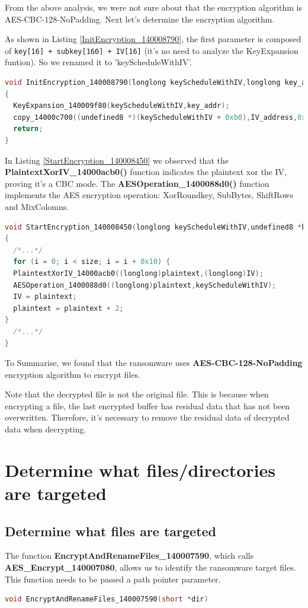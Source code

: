 \documentclass[11pt]{article}
\begin{document}
From the above analysis, we were not sure about that the encryption algorithm is AES-CBC-128-NoPadding. Next let's determine the encryption algorithm. 

As shown in Listing \ref{InitEncryption_140008790}, the first parameter is composed of \lstinline|key[16] + subkey[160] + IV[16]| (it's no need to analyze the KeyExpansion funtion). So we renamed it to 'keyScheduleWithIV'.
\begin{lstlisting}[language=c++, caption=InitEncryption\_140008790, label=InitEncryption_140008790]
void InitEncryption_140008790(longlong keyScheduleWithIV,longlong key_addr,undefined8 *IV_address)
{
  KeyExpansion_140009f80(keyScheduleWithIV,key_addr);
  copy_14000c700((undefined8 *)(keyScheduleWithIV + 0xb0),IV_address,0x10);
  return;
}
\end{lstlisting}

In Listing \ref{StartEncryption_140008450} we observed that the \textbf{PlaintextXorIV\_14000acb0()} function indicates the plaintext xor the IV, proving it's a CBC mode. The \textbf{AESOperation\_1400088d0()} function implements the AES encryption operation: XorRoundkey, SubBytes, ShiftRows and MixColomns.

\begin{lstlisting}[language=c++, caption=Part of StartEncryption\_140008450, label=StartEncryption_140008450]
void StartEncryption_140008450(longlong keyScheduleWithIV,undefined8 *buffer,uint size)
{
  /*...*/
  for (i = 0; i < size; i = i + 0x10) {
  PlaintextXorIV_14000acb0((longlong)plaintext,(longlong)IV);
  AESOperation_1400088d0((longlong)plaintext,keyScheduleWithIV);
  IV = plaintext;
  plaintext = plaintext + 2;
}
  /*...*/
}
\end{lstlisting}

To Summarise, we found that the ransomware uses \textbf{AES-CBC-128-NoPadding} encryption algorithm to encrypt files.

Note that the decrypted file is not the original file. This is because when encrypting a file, the last encrypted buffer has residual data that has not been overwritten. Therefore, it's necessary to remove the residual data of decrypted data when decrypting.

\section{Determine what files/directories are targeted}
\subsection{Determine what files are targeted}
The function \textbf{EncryptAndRenameFiles\_140007590}, which calls \textbf{AES\_Encrypt\_140007080}, allows us to identify the ransomware target files. This function needs to be passed a path pointer parameter.
\begin{lstlisting}[language=c++]
void EncryptAndRenameFiles_140007590(short *dir)
\end{lstlisting}
\end{document}
